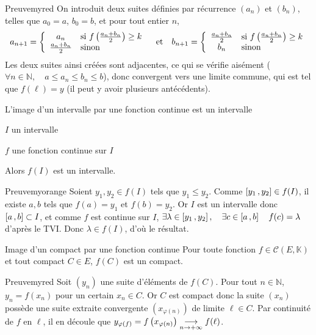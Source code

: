    \begin{demo}{Preuve}{myred}
        On introduit deux suites définies par récurrence $(a_n)$ et $(b_n)$, telles que $a_0 = a$, $b_0 = b$, et pour tout entier $n$, 
        \[ a_{n+1} = \sisinon{a_n}{f\left(\frac{a_n + b_n}{2}\right) \geq k}{\frac{a_n + b_n}{2}} \esp{et} b_{n+1} = \sisinon{\frac{a_n + b_n}{2}}{f\left(\frac{a_n + b_n}{2}\right) \geq k}{b_n} \]
        Les deux suites ainsi créées sont adjacentes, ce qui se vérifie aisément ($\forall n \in \mathbb{N}, \quad a \leq a_n \leq b_n \leq b$), donc convergent vers une limite commune, qui est tel que $f(\ell) = y$ (il peut y avoir plusieurs antécédents).
    \end{demo}

    \begin{coro}{L’image d’un intervalle par une fonction continue est un intervalle}{}
        \begin{suppose}
            \item $I$ un intervalle 
            \item $f$ une fonction continue sur $I$
        \end{suppose}
        Alors $f(I)$ est un intervalle.
    \end{coro}

    \begin{demo}{Preuve}{myorange}
        Soient $y_1,y_2 \in f(I)$ tels que $y_1 \leq y_2$. Comme $\left[ y_1 \, , y_2 \right] \in f(I)$, il existe $a,b$ tels que $f(a) = y_1$ et $f(b) = y_2$. Or $I$ est un intervalle donc $\left[ a \, , b \right] \subset I$, et comme $f$ est continue sur $I$, $\exists \lambda \in \left[ y_1 \, , y_2 \right], \quad \exists c \in \left[ a \, , b \right] \quad f(c) = \lambda$ d’après le TVI. Donc $\lambda \in f(I)$, d’où le résultat.
    \end{demo}

    \begin{theo}{Image d’un compact par une fonction continue}{}
        Pour toute fonction $f \in \mathcal{C}(E,\mathbb{K})$ et tout compact $C \in E$, $f(C)$ est un compact.
    \end{theo}

    \begin{demo}{Preuve}{myred}
        Soit $(y_n)$ une suite d’éléments de $f(C)$. Pour tout $n \in \mathbb{N}$, $y_n = f(x_n)$ pour un certain $x_n \in C$. Or $C$ est compact donc la suite $(x_n)$ possède une suite extraite convergente $(x_{\varphi(n)})$ de limite $\ell \in C$. Par continuité de $f$ en $\ell$, il en découle que $y_{\varphi(f)} = f\left(x_{\varphi(n)}\right) \underset{n \rightarrow +\infty}{\longrightarrow} f(\ell)$.
    \end{demo}

